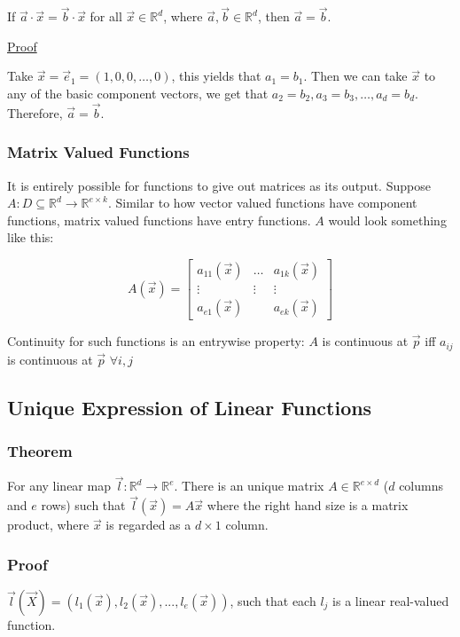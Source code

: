 \documentclass[11 pt, twoside]{article}
\begin{document}
If $\vec{a} \cdot \vec{x} = \vec{b} \cdot \vec{x}$ for all $\vec{x} \in
\mathbb{R}^d$, where $\vec{a}, \vec{b} \in \mathbb{R}^d$, then $\vec{a} =
\vec{b}$.

\underline{Proof}

Take $\vec{x} = \vec{e}_1 = (1, 0, 0, \dots, 0)$, this yields that $a_1 = b_1$.
Then we can take $\vec{x}$ to any of the basic component vectors, we get that
$a_2 = b_2, a_3 = b_3, \dots, a_d = b_d$. Therefore, $\vec{a} = \vec{b}$.

\subsubsection{Matrix Valued Functions}

It is entirely possible for functions to give out matrices as its output.
Suppose $A : D \subseteq \mathbb{R}^d \to \mathbb{R}^{e \times k}$.
Similar to how vector valued functions have component functions, matrix valued
functions have entry functions. $A$ would look something like this:

\[
A(\vec{x}) = \left[\begin{array}{ccc}
a_{11}(\vec{x}) & \dots & a_{1k}(\vec{x})\\
\vdots & \vdots & \vdots \\
a_{e1}(\vec{x}) & & a_{ek}(\vec{x})
\end{array}\right]
\]

Continuity for such functions is an entrywise property: $A$ is continuous at
$\vec{p}$ iff $a_{ij}$ is continuous at $\vec{p}$ $\forall i, j$
\subsection{Unique Expression of Linear Functions}
\subsubsection{Theorem}
For any linear map $\vec{l}: \mathbb{R}^d \to \mathbb{R}^e$.
There is an unique matrix $A \in \mathbb{R}^{e \times d}$ ($d$ columns and
$e$ rows) such that $\vec{l}(\vec{x}) = A\vec{x}$ where the right hand size is a
matrix product, where $\vec{x}$ is regarded as a $d \times 1$ column.

\subsubsection{Proof}
$\vec{l}(\vec{X}) = (l_1(\vec{x}), l_2(\vec{x}),...,l_e(\vec{x}))$, such that each $l_j$ is a linear real-valued function. 
\end{document}
